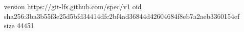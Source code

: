 version https://git-lfs.github.com/spec/v1
oid sha256:3ba3b55f3e25d5bfd34414dfc2bf4ad36844d42604684f8eb7a2aeb3360154ef
size 44451
